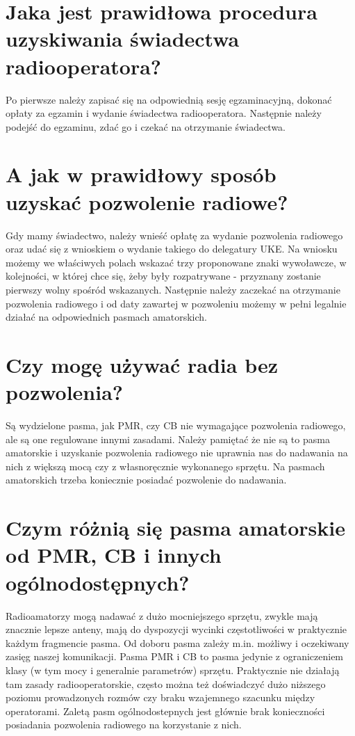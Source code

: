 \documentclass[a4paper,12pt]{article}
\begin{document}
\section{Jaka jest prawidłowa procedura uzyskiwania świadectwa radiooperatora?}
Po pierwsze należy zapisać się na odpowiednią sesję egzaminacyjną, dokonać opłaty za egzamin i wydanie świadectwa radiooperatora. Następnie należy podejść do egzaminu, zdać go i czekać na otrzymanie świadectwa.

\section{A jak w prawidłowy sposób uzyskać pozwolenie radiowe?}
Gdy mamy świadectwo, należy wnieść opłatę za wydanie pozwolenia radiowego oraz udać się z wnioskiem o wydanie takiego do delegatury UKE. Na wniosku możemy we właściwych polach wskazać trzy proponowane znaki wywoławcze, w kolejności, w której chce się, żeby były rozpatrywane - przyznany zostanie pierwszy wolny spośród wskazanych. Następnie należy zaczekać na otrzymanie pozwolenia radiowego i od daty zawartej w pozwoleniu możemy w pełni legalnie działać na odpowiednich pasmach amatorskich.

\section{Czy mogę używać radia bez pozwolenia?}
Są wydzielone pasma, jak PMR, czy CB nie wymagające pozwolenia radiowego, ale są one regulowane innymi zasadami. Należy pamiętać że nie są to pasma amatorskie i uzyskanie pozwolenia radiowego nie uprawnia nas do nadawania na nich z większą mocą czy z własnoręcznie wykonanego sprzętu. Na pasmach amatorskich trzeba koniecznie posiadać pozwolenie do nadawania.

\section{Czym różnią się pasma amatorskie od PMR, CB i innych ogólnodostępnych?}
Radioamatorzy mogą nadawać z dużo mocniejszego sprzętu, zwykle mają znacznie lepsze anteny, mają do dyspozycji wycinki częstotliwości w praktycznie każdym fragmencie pasma.
Od doboru pasma zależy m.in. możliwy i oczekiwany zasięg naszej komunikacji. Pasma PMR i CB to pasma jedynie z ograniczeniem klasy (w tym mocy i generalnie parametrów) sprzętu. Praktycznie nie działają tam zasady radiooperatorskie, często można też doświadczyć dużo niższego poziomu prowadzonych rozmów czy braku wzajemnego szacunku między operatorami. Zaletą pasm ogólnodostepnych jest głównie brak konieczności posiadania pozwolenia radiowego na korzystanie z nich.
\end{document}
